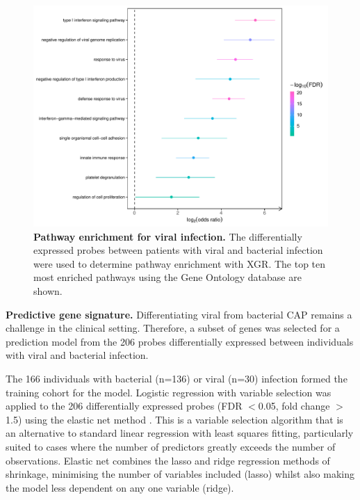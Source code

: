 \FloatBarrier
\begin{figure}[htbp]
\centering
\includegraphics[width=\textwidth]{./Results3/Images/xgr-viral.pdf}
\caption[Pathway analysis for viral infection]{\textbf{Pathway enrichment for viral infection.} The differentially expressed probes between patients with viral and bacterial infection were used to determine pathway enrichment with XGR. The top ten most enriched pathways using the Gene Ontology database are shown.}
\label{fig:xgr-viral}
\end{figure}
\FloatBarrier
 
 \textbf{Predictive gene signature.} Differentiating viral from bacterial CAP remains a challenge in the clinical setting. Therefore, a subset of genes was selected for a prediction model from the 206 probes differentially expressed between individuals with viral and bacterial infection. 
 
The 166 individuals with bacterial (n=136) or viral (n=30) infection formed the training cohort for the model. Logistic regression with variable selection was applied to the 206 differentially expressed probes (FDR $<$0.05, fold change $>$1.5) using the elastic net method \parencite{Zou2005} \parencite{Herberg2016}. This is a variable selection algorithm that is an alternative to standard linear regression with least squares fitting, particularly suited to cases where the number of predictors greatly exceeds the number of observations. Elastic net combines the lasso and ridge regression methods of shrinkage, minimising the number of variables included (lasso) whilst also making the model less dependent on any one variable (ridge).
 
